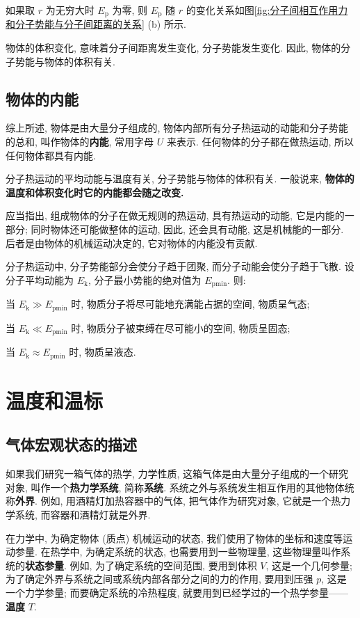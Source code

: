 \documentclass[UTF8,openany,fontset=fandol]{ctexbook}
\theoremstyle{chinesetextbook}
\begin{document}
如果取 $r$ 为无穷大时 $E_\text{p}$ 为零, 则 $E_\text{p}$ 随 $r$ 的变化关系如图\ref{fig:分子间相互作用力和分子势能与分子间距离的关系} (b) 所示.

物体的体积变化, 意味着分子间距离发生变化, 分子势能发生变化. 因此, 物体的分子势能与物体的体积有关.
\subsection{物体的内能}
综上所述, 物体是由大量分子组成的, 物体内部所有分子热运动的动能和分子势能的总和, 叫作物体的\textbf{内能}, 常用字母 $U$ 来表示. 任何物体的分子都在做热运动, 所以任何物体都具有内能.

分子热运动的平均动能与温度有关, 分子势能与物体的体积有关. 一般说来, \textbf{物体的温度和体积变化时它的内能都会随之改变.}

应当指出, 组成物体的分子在做无规则的热运动, 具有热运动的动能, 它是内能的一部分; 同时物体还可能做整体的运动, 因此, 还会具有动能, 这是机械能的一部分. 后者是由物体的机械运动决定的, 它对物体的内能没有贡献.

\bigskip

分子热运动中, 分子势能部分会使分子趋于团聚, 而分子动能会使分子趋于飞散. 设分子平均动能为 $E_\text{k}$, 分子最小势能的绝对值为 $E_\text{pmin}$. 则:

当 $E_\text{k}\gg E_\text{pmin}$ 时, 物质分子将尽可能地充满能占据的空间, 物质呈气态;

当 $E_\text{k}\ll E_\text{pmin}$ 时, 物质分子被束缚在尽可能小的空间, 物质呈固态;

当 $E_\text{k}\approx E_\text{pmin}$ 时, 物质呈液态.
\section{温度和温标}
\subsection{气体宏观状态的描述}
如果我们研究一箱气体的热学, 力学性质, 这箱气体是由大量分子组成的一个研究对象, 叫作一个\textbf{热力学系统}, 简称\textbf{系统}. 系统之外与系统发生相互作用的其他物体统称\textbf{外界}. 例如, 用酒精灯加热容器中的气体, 把气体作为研究对象, 它就是一个热力学系统, 而容器和酒精灯就是外界.

在力学中, 为确定物体 (质点) 机械运动的状态, 我们使用了物体的坐标和速度等运动参量. 在热学中, 为确定系统的状态, 也需要用到一些物理量, 这些物理量叫作系统的\textbf{状态参量}. 例如, 为了确定系统的空间范围, 要用到体积 $V$, 这是一个几何参量; 为了确定外界与系统之间或系统内部各部分之间的力的作用, 要用到压强 $p$, 这是一个力学参量; 而要确定系统的冷热程度, 就要用到已经学过的一个热学参量——\textbf{温度} $T$.
\end{document}
